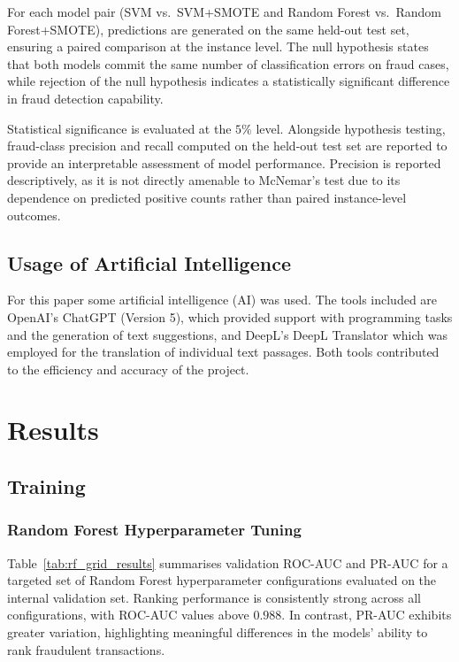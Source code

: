 \documentclass[oneside,12pt,parskip=half,american,numbers=noenddot]{scrreprt}
\begin{document}
For each model pair (SVM vs.\ SVM+SMOTE and Random Forest vs.\ Random Forest+SMOTE), predictions are generated on the same held-out test set, ensuring a paired comparison at the instance level. The null hypothesis states that both models commit the same number of classification errors on fraud cases, while rejection of the null hypothesis indicates a statistically significant difference in fraud detection capability.

Statistical significance is evaluated at the $5\%$ level. Alongside hypothesis testing, fraud-class precision and recall computed on the held-out test set are reported to provide an interpretable assessment of model performance. Precision is reported descriptively, as it is not directly amenable to McNemar’s test due to its dependence on predicted positive counts rather than paired instance-level outcomes.

\section{Usage of Artificial Intelligence}\label{Usage of Artificial Intelligence}
For this paper some artificial intelligence (AI) was used. The tools included are OpenAI's ChatGPT (Version 5), which provided support with programming tasks and the generation of text suggestions, and DeepL's DeepL Translator which was employed for the translation of individual text passages. Both tools contributed to the efficiency and accuracy of the project. 



\pagebreak
\chapter{Results}
\section{Training}

\subsection{Random Forest Hyperparameter Tuning}
Table~\ref{tab:rf_grid_results} summarises validation ROC-AUC and PR-AUC for a targeted set of Random Forest hyperparameter configurations evaluated on the internal validation set. Ranking performance is consistently strong across all configurations, with ROC-AUC values above $0.988$. In contrast, PR-AUC exhibits greater variation, highlighting meaningful differences in the models’ ability to rank fraudulent transactions.
\end{document}
